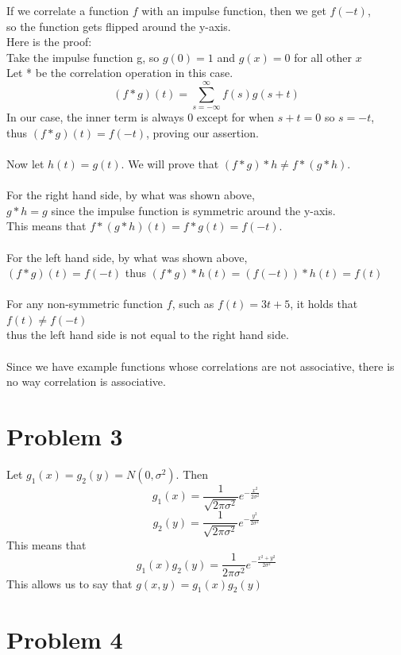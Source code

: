 \documentclass[11pt,psfig]{article}
\begin{document}
If we correlate a function $f$ with an impulse function, then we get $f(-t)$, \\
so the function gets flipped around the y-axis. \\
Here is the proof:\\
Take the impulse function g, so $g(0)=1$ and $g(x)=0$ for all other $x$ \\
Let * be the correlation operation in this case. \\
\[
(f*g)(t) = \sum_{s=-\infty}^{\infty} f(s)g(s+t)
\]
In our case, the inner term is always $0$ except for when $s+t=0$ so $s=-t$, \\
thus $(f*g)(t)=f(-t)$, proving our assertion. \\
\\
Now let $h(t)=g(t)$. We will prove that $(f*g)*h \neq f*(g*h)$. \\
\\
For the right hand side, by what was shown above, \\
$g*h = g$ since the impulse function is symmetric around the y-axis. \\
This means that $f*(g*h)(t) = f*g(t) = f(-t)$. \\
\\
For the left hand side, by what was shown above, \\
$(f*g)(t) = f(-t)$ thus $(f*g)*h(t) = (f(-t))*h(t) = f(t)$\\
\\
For any non-symmetric function $f$, such as $f(t) = 3t+5$, it holds that $f(t) \neq f(-t)$ \\
thus the left hand side is not equal to the right hand side. \\
\\
Since we have example functions whose correlations are not associative, there is no way correlation is associative. 



\section*{Problem 3}

Let $g_1(x) = g_2(y) = N(0,\sigma^2)$. Then
\[
g_1(x) = \frac{1}{\sqrt{2\pi \sigma^2}} e^{-\frac{x^2}{2\sigma^2}}
\]
\[
g_2(y) = \frac{1}{\sqrt{2\pi \sigma^2}} e^{-\frac{y^2}{2\sigma^2}}
\]
This means that
\[
g_1(x)g_2(y) = \frac{1}{2\pi \sigma^2} e^{-\frac{x^2 + y^2}{2\sigma^2}}
\]
This allows us to say that $g(x,y) = g_1(x)g_2(y)$

\section*{Problem 4}
\end{document}
